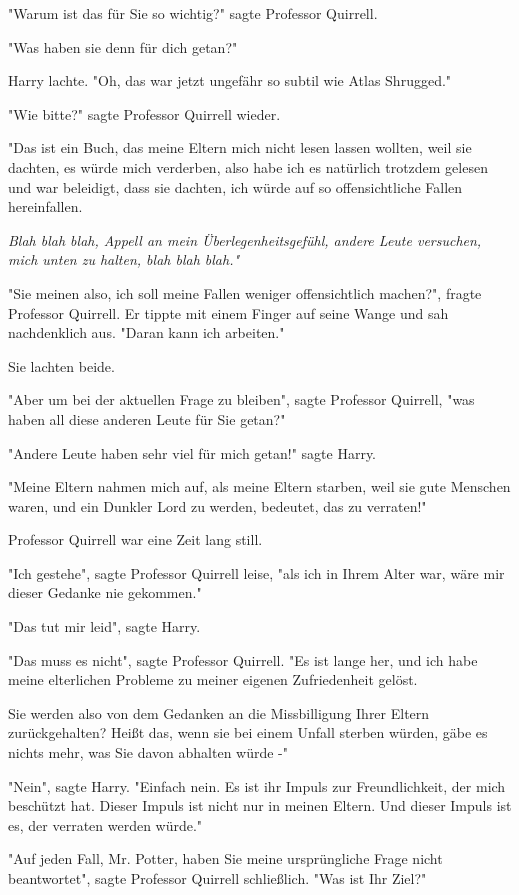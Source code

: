 {"Warum ist das für Sie so wichtig?" sagte Professor Quirrell.

"Was haben sie denn für dich getan?"

Harry lachte. "Oh, das war jetzt ungefähr so subtil wie Atlas Shrugged."

"Wie bitte?" sagte Professor Quirrell wieder.

"Das ist ein Buch, das meine Eltern mich nicht lesen lassen wollten, weil sie dachten, es würde mich verderben, also habe ich es natürlich trotzdem gelesen und war beleidigt, dass sie dachten, ich würde auf so offensichtliche Fallen hereinfallen.

\emph{Blah blah blah, Appell an mein Überlegenheitsgefühl, andere Leute versuchen, mich unten zu halten, blah blah blah."}

"Sie meinen also, ich soll meine Fallen weniger offensichtlich machen?", fragte Professor Quirrell. Er tippte mit einem Finger auf seine Wange und sah nachdenklich aus. "Daran kann ich arbeiten."

Sie lachten beide.

"Aber um bei der aktuellen Frage zu bleiben", sagte Professor Quirrell, "was haben all diese anderen Leute für Sie getan?"

"Andere Leute haben sehr viel für mich getan!" sagte Harry.

"Meine Eltern nahmen mich auf, als meine Eltern starben, weil sie gute Menschen waren, und ein Dunkler Lord zu werden, bedeutet, das zu verraten!"

Professor Quirrell war eine Zeit lang still.

"Ich gestehe", sagte Professor Quirrell leise, "als ich in Ihrem Alter war, wäre mir dieser Gedanke nie gekommen."

"Das tut mir leid", sagte Harry.

"Das muss es nicht", sagte Professor Quirrell. "Es ist lange her, und ich habe meine elterlichen Probleme zu meiner eigenen Zufriedenheit gelöst.

Sie werden also von dem Gedanken an die Missbilligung Ihrer Eltern zurückgehalten? Heißt das, wenn sie bei einem Unfall sterben würden, gäbe es nichts mehr, was Sie davon abhalten würde -"

"Nein", sagte Harry. "Einfach nein. Es ist ihr Impuls zur Freundlichkeit, der mich beschützt hat. Dieser Impuls ist nicht nur in meinen Eltern. Und dieser Impuls ist es, der verraten werden würde."

"Auf jeden Fall, Mr. Potter, haben Sie meine ursprüngliche Frage nicht beantwortet", sagte Professor Quirrell schließlich. "Was ist Ihr Ziel?"

}
